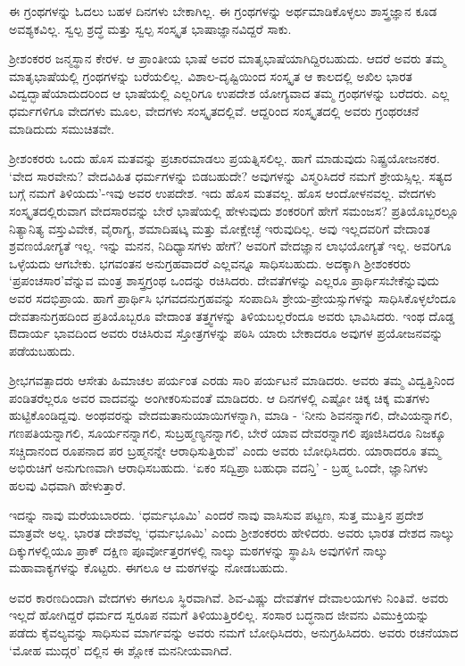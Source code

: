 ಈ ಗ್ರಂಥಗಳನ್ನು ಓದಲು ಬಹಳ ದಿನಗಳು ಬೇಕಾಗಿಲ್ಲ. ಈ ಗ್ರಂಥಗಳನ್ನು ಅರ್ಥಮಾಡಿಕೊಳ್ಳಲು ಶಾಸ್ತ್ರಜ್ಞಾನ ಕೂಡ ಅವಶ್ಯಕವಿಲ್ಲ. ಸ್ವಲ್ಪ ಶ್ರದ್ಧೆ ಮತ್ತು ಸ್ವಲ್ಪ ಸಂಸ್ಕೃತ ಭಾಷಾಜ್ಞಾನವಿದ್ದರೆ ಸಾಕು.

ಶ್ರೀಶಂಕರರ ಜನ್ಮಸ್ಥಾನ ಕೇರಳ. ಆ ಪ್ರಾಂತೀಯ ಭಾಷೆ ಅವರ ಮಾತೃಭಾಷೆಯಾಗಿದ್ದಿರಬಹುದು. ಆದರೆ ಅವರು ತಮ್ಮ ಮಾತೃಭಾಷೆಯಲ್ಲಿ ಗ್ರಂಥಗಳನ್ನು ಬರೆಯಲಿಲ್ಲ. ವಿಶಾಲ-ದೃಷ್ಟಿಯಿಂದ ಸಂಸ್ಕೃತ ಆ ಕಾಲದಲ್ಲಿ ಅಖಿಲ ಭಾರತ ವಿದ್ವದ್ಭಾಷೆಯಾದುದರಿಂದ ಆ ಭಾಷೆಯಲ್ಲಿ ಎಲ್ಲರಿಗೂ ಉಪದೇಶ ಯೋಗ್ಯವಾದ ತಮ್ಮ ಗ್ರಂಥಗಳನ್ನು ಬರೆದರು. ಎಲ್ಲ ಧರ್ಮಗಳಿಗೂ ವೇದಗಳು ಮೂಲ, ವೇದಗಳು ಸಂಸ್ಕೃತದಲ್ಲಿವೆ. ಆದ್ದರಿಂದ ಸಂಸ್ಕೃತದಲ್ಲಿ ಅವರು ಗ್ರಂಥರಚನೆ ಮಾಡಿದುದು ಸಮುಚಿತವೇ.

ಶ್ರೀಶಂಕರರು ಒಂದು ಹೊಸ ಮತವನ್ನು ಪ್ರಚಾರಮಾಡಲು ಪ್ರಯತ್ನಿಸಲಿಲ್ಲ. ಹಾಗೆ ಮಾಡುವುದು ನಿಷ್ಪ್ರಯೋಜನಕರ. `ವೇದ ಸಾರವೇನು? ವೇದವಿಹಿತ ಧರ್ಮಗಳನ್ನು ಬಿಡಬಹುದೇ? ಅವುಗಳನ್ನು ವಿಸ್ಮರಿಸಿದರೆ ನಮಗೆ ಶ್ರೇಯಸ್ಸಿಲ್ಲ. ಸತ್ಯದ ಬಗ್ಗೆ ನಮಗೆ ತಿಳಿಯದು'-ಇವು ಅವರ ಉಪದೇಶ. ಇದು ಹೊಸ ಮತವಲ್ಲ. ಹೊಸ ಆಂದೋಳನವಲ್ಲ. ವೇದಗಳು ಸಂಸ್ಕೃತದಲ್ಲಿರುವಾಗ ವೇದಸಾರವನ್ನು ಬೇರೆ ಭಾಷೆಯಲ್ಲಿ ಹೇಳುವುದು ಶಂಕರರಿಗೆ ಹೇಗೆ ಸಮಂಜಸ? ಪ್ರತಿಯೊಬ್ಬರಲ್ಲೂ ನಿತ್ಯಾನಿತ್ಯ ವಸ್ತುವಿವೇಕ, ವೈರಾಗ್ಯ, ಶಮಾದಿಷಟ್ಕ ಮತ್ತು ಮೋಕ್ಷೇಚ್ಛೆ ಇರುವುದಿಲ್ಲ. ಅವು ಇಲ್ಲದವರಿಗೆ ವೇದಾಂತ ಶ್ರವಣಯೋಗ್ಯತೆ ಇಲ್ಲ. ಇನ್ನು ಮನನ, ನಿದಿಧ್ಯಾಸಗಳು ಹೇಗೆ? ಅವರಿಗೆ ವೇದಜ್ಞಾನ ಲಾಭಯೋಗ್ಯತೆ ಇಲ್ಲ. ಅವರಿಗೂ ಒಳ್ಳೆಯದು ಆಗಬೇಕು. ಭಗವಂತನ ಅನುಗ್ರಹವಾದರೆ ಎಲ್ಲವನ್ನೂ ಸಾಧಿಸಬಹುದು. ಅದಕ್ಕಾಗಿ ಶ್ರೀಶಂಕರರು `ಪ್ರಪಂಚಸಾರ'ವೆನ್ನುವ ಮಂತ್ರ ಶಾಸ್ತ್ರಗ್ರಂಥ ಒಂದನ್ನು ರಚಿಸಿದರು. ದೇವತೆಗಳನ್ನು ಎಲ್ಲರೂ ಪ್ರಾರ್ಥಿಸಬೇಕೆನ್ನುವುದು ಅವರ ಸದಭಿಪ್ರಾಯ. ಹಾಗೆ ಪ್ರಾರ್ಥಿಸಿ ಭಗವದನುಗ್ರಹವನ್ನು ಸಂಪಾದಿಸಿ ಶ್ರೇಯ-ಪ್ರೇಯಸ್ಸುಗಳನ್ನು ಸಾಧಿಸಿಕೊಳ್ಳಲೆಂದೂ ದೇವತಾನುಗ್ರಹದಿಂದ ಪ್ರತಿಯೊಬ್ಬರೂ ವೇದಾಂತ ತತ್ತ್ವಗಳನ್ನು ತಿಳಿಯಬಲ್ಲರೆಂದೂ ಅವರು ಭಾವಿಸಿದರು. ಇಂಥ ದೊಡ್ಡ ಔದಾರ್ಯ ಭಾವದಿಂದ ಅವರು ರಚಿಸಿರುವ ಸ್ತೋತ್ರಗಳನ್ನು ಪಠಿಸಿ ಯಾರು ಬೇಕಾದರೂ ಅವುಗಳ ಪ್ರಯೋಜನವನ್ನು ಪಡೆಯಬಹುದು.

ಶ್ರೀಭಗವತ್ಪಾದರು ಆಸೇತು ಹಿಮಾಚಲ ಪರ್ಯಂತ ಎರಡು ಸಾರಿ ಪರ್ಯಟನೆ ಮಾಡಿದರು. ಅವರು ತಮ್ಮ ವಿದ್ವತ್ತಿನಿಂದ ಪಂಡಿತರೆಲ್ಲರೂ ಅವರ ವಾದವನ್ನು ಅಂಗೀಕರಿಸುವಂತೆ ಮಾಡಿದರು. ಆ ದಿನಗಳಲ್ಲಿ ಎಷ್ಟೋ ಚಿಕ್ಕ ಚಿಕ್ಕ ಮತಗಳು ಹುಟ್ಟಿಕೊಂಡಿದ್ದವು. ಅಂಥವರನ್ನು ವೇದಮತಾನುಯಾಯಿಗಳನ್ನಾಗಿ, ಮಾಡಿ - `ನೀನು ಶಿವನನ್ನಾಗಲಿ, ದೇವಿಯನ್ನಾಗಲಿ, ಗಣಪತಿಯನ್ನಾಗಲಿ, ಸೂರ್ಯನನ್ನಾಗಲಿ, ಸುಬ್ರಹ್ಮಣ್ಯನನ್ನಾಗಲಿ, ಬೇರೆ ಯಾವ ದೇವರನ್ನಾಗಲಿ ಪೂಜಿಸಿದರೂ ನಿಜಕ್ಕೂ ಸಚ್ಚಿದಾನಂದ ರೂಪನಾದ ಪರ ಬ್ರಹ್ಮನನ್ನೇ ಆರಾಧಿಸುತ್ತಿರುವೆ' ಎಂದು ಅವರು ಬೋಧಿಸಿದರು. ಯಾರಾದರೂ ತಮ್ಮ ಅಭಿರುಚಿಗೆ ಅನುಗುಣವಾಗಿ ಆರಾಧಿಸಬಹುದು. `ಏಕಂ ಸದ್ವಿಪ್ರಾ ಬಹುಧಾ ವದನ್ತಿ' - ಬ್ರಹ್ಮ ಒಂದೇ, ಜ್ಞಾನಿಗಳು ಹಲವು ವಿಧವಾಗಿ ಹೇಳುತ್ತಾರೆ.

ಇದನ್ನು ನಾವು ಮರೆಯಬಾರದು. `ಧರ್ಮಭೂಮಿ' ಎಂದರೆ ನಾವು ವಾಸಿಸುವ ಪಟ್ಟ‌ಣ, ಸುತ್ತ ಮುತ್ತಿನ ಪ್ರದೇಶ ಮಾತ್ರವೇ ಅಲ್ಲ. ಭಾರತ ದೇಶವೆಲ್ಲ `ಧರ್ಮಭೂಮಿ' ಎಂದು ಶ್ರೀಶಂಕರರು ಹೇಳಿದರು. ಅವರು ಭಾರತ ದೇಶದ ನಾಲ್ಕು ದಿಕ್ಕುಗಳಲ್ಲಿಯೂ ಪ್ರಾಕ್ ದಕ್ಷಿಣ ಪೂರ್ವೋತ್ತರಗಳಲ್ಲಿ ನಾಲ್ಕು ಮಠಗಳನ್ನು ಸ್ಥಾಪಿಸಿ ಅವುಗಳಿಗೆ ನಾಲ್ಕು ಮಹಾವಾಕ್ಯಗಳನ್ನು ಕೊಟ್ಟರು. ಈಗಲೂ ಆ ಮಠಗಳನ್ನು ನೋಡಬಹುದು.

ಅವರ ಕಾರಣದಿಂದಾಗಿ ವೇದಗಳು ಈಗಲೂ ಸ್ಥಿರವಾಗಿವೆ. ಶಿವ-ವಿಷ್ಣು ದೇವತೆಗಳ ದೇವಾಲಯಗಳು ನಿಂತಿವೆ. ಅವರು ಇಲ್ಲದೆ ಹೋಗಿದ್ದರೆ ಧರ್ಮದ ಸ್ವರೂಪ ನಮಗೆ ತಿಳಿಯುತ್ತಿರಲಿಲ್ಲ. ಸಂಸಾರ ಬದ್ಧನಾದ ಜೀವನು ವಿಮುಕ್ತಿಯನ್ನು ಪಡೆದು ಕೈವಲ್ಯವನ್ನು ಸಾಧಿಸುವ ಮಾರ್ಗವನ್ನು ಅವರು ನಮಗೆ ಬೋಧಿಸಿದರು, ಅನುಗ್ರಹಿಸಿದರು. ಅವರು ರಚನೆಯಾದ `ಮೋಹ ಮುದ್ಗರ' ದಲ್ಲಿನ ಈ ಶ್ಲೋಕ ಮನನೀಯವಾಗಿದೆ.

